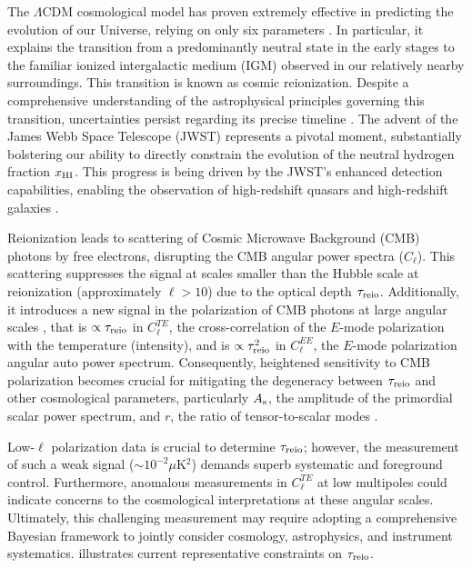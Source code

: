 The $\Lambda$CDM cosmological model has proven extremely effective in
predicting the evolution of our Universe, relying on only six parameters
\cite{Planck2020a}.
In particular, it explains the transition from a predominantly neutral
state in the early stages to the familiar ionized intergalactic medium
(IGM) observed in our relatively nearby surroundings.
This transition is known as cosmic reionization.
Despite a comprehensive understanding of the astrophysical principles
governing this transition, uncertainties persist regarding its precise
timeline \cite{Jin2023}.
The advent of the James Webb Space Telescope (JWST) \cite{Gardner2006}
represents a pivotal moment, substantially bolstering our ability to
directly constrain the evolution of the neutral hydrogen fraction
$x_{\mathrm{HI}}$.
This progress is being driven by the JWST's enhanced detection
capabilities, enabling the observation of high-redshift quasars
\cite{Eilers2023} and high-redshift galaxies
\cite{Adams2023, Bradley2023, Donnan2023,Ning2024}.

Reionization leads to scattering of Cosmic Microwave Background (CMB)
photons by free electrons, disrupting the CMB angular power spectra
($C_\ell$).
This scattering suppresses the signal at scales smaller than the Hubble
scale at reionization (approximately $\ell>10$) \cite{Planck2020b} due
to the optical depth $\tau_{\mathrm{reio}}$.
Additionally, it introduces a new signal in the polarization of CMB
photons at large angular scales \cite{Planck2020a}, that is $\propto
\tau_{\mathrm{reio}}$ in $C^{TE}_\ell$, the cross-correlation of the $E$-mode
polarization with the temperature (intensity), and is $\propto
\tau_{\mathrm{reio}}^2$ in $C^{EE}_\ell$, the $E$-mode polarization angular auto
power spectrum.
Consequently, heightened sensitivity to CMB polarization becomes crucial
for mitigating the degeneracy between $\tau_{\mathrm{reio}}$ and other
cosmological parameters, particularly $A_\mathrm{s}$, the amplitude of the
primordial scalar power spectrum, and $r$, the ratio of tensor-to-scalar
modes \cite{Natale2020}.

Low-$\ell$ polarization data is crucial to determine $\tau_{\mathrm{reio}}$; however,
the measurement of such a weak signal ($\sim 10^{-2} \mu$K$^2$) demands
superb systematic and foreground control\cite{Planck2020b}. Furthermore,
anomalous measurements in $C^{TE}_\ell$ at low multipoles\cite{Planck2020a}
could indicate concerns to the cosmological interpretations at these angular scales.
Ultimately, this challenging measurement may require adopting a comprehensive
Bayesian framework to jointly consider cosmology, astrophysics, and
instrument systematics\cite{Paradiso2023}.  illustrates current
representative constraints on $\tau_{\mathrm{reio}}$.

